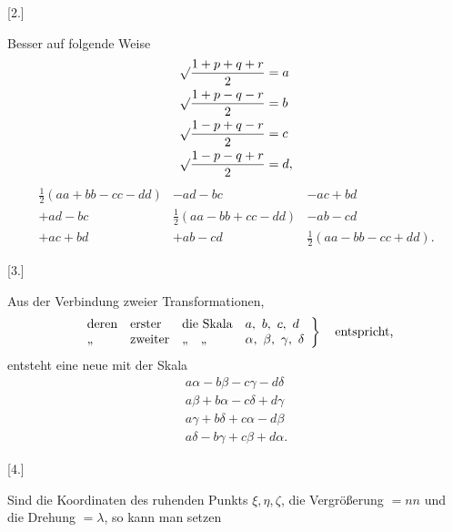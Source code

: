 \begin{center}[2.]\end{center}

Besser auf folgende Weise
\[
\begin{aligned}
\mathord{\surd}\frac{1+p+q+r}{2}&=a\\
\mathord{\surd}\frac{1+p-q-r}{2}&=b\\
\mathord{\surd}\frac{1-p+q-r}{2}&=c\\
\mathord{\surd}\frac{1-p-q+r}{2}&=d,
\end{aligned}
\]
\[
\begin{array}{ccc}
\tfrac12(aa+bb-cc-dd)&-ad-bc&-ac+bd\\
+ad-bc&\tfrac12(aa-bb+cc-dd)&-ab-cd\\
+ac+bd&+ab-cd&\tfrac12(aa-bb-cc+dd).
\end{array}
\]

\begin{center}[3.]\end{center}

Aus der Verbindung zweier Transformationen,
\[
\left.\begin{array}{llll}
\text{deren}&\text{erster}&\text{die Skala}&a,\ b,\ c,\ d\\
\text{,,}&\text{zweiter}&\text{,,\quad,,}&\alpha,\ \beta,\ \gamma,\ \delta
\end{array}\right\}\quad\text{entspricht,}
\]
entsteht eine neue mit der Skala
\[
\begin{gathered}
a\alpha-b\beta-c\gamma-d\delta\\
a\beta+b\alpha-c\delta+d\gamma\\
a\gamma+b\delta+c\alpha-d\beta\\
a\delta-b\gamma+c\beta+d\alpha.
\end{gathered}
\]

\begin{center}[4.]\end{center}

Sind die Koordinaten des ruhenden Punkts $\xi,\eta,\zeta$, die Vergrößerung $=nn$ und die Drehung $=\lambda$, so kann man setzen
